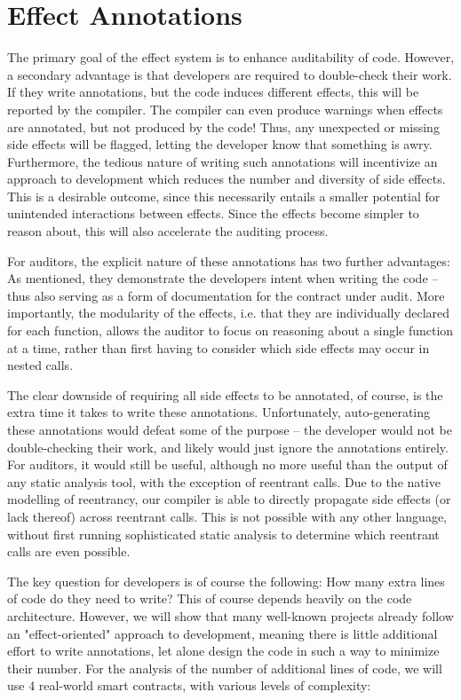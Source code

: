 \section{Effect Annotations}

The primary goal of the effect system is to enhance auditability of code. However, a secondary advantage is that developers are required to double-check their work. If they write annotations, but the code induces different effects, this will be reported by the compiler. The compiler can even produce warnings when effects are annotated, but not produced by the code! Thus, any unexpected or missing side effects will be flagged, letting the developer know that something is awry. Furthermore, the tedious nature of writing such annotations will incentivize an approach to development which reduces the number and diversity of side effects. This is a desirable outcome, since this necessarily entails a smaller potential for unintended interactions between effects. Since the effects become simpler to reason about, this will also accelerate the auditing process.
\par
For auditors, the explicit nature of these annotations has two further advantages: As mentioned, they demonstrate the developers intent when writing the code -- thus also serving as a form of documentation for the contract under audit. More importantly, the modularity of the effects, i.e. that they are individually declared for each function, allows the auditor to focus on reasoning about a single function at a time, rather than first having to consider which side effects may occur in nested calls.
\par
The clear downside of requiring all side effects to be annotated, of course, is the extra time it takes to write these annotations. Unfortunately, auto-generating these annotations would defeat some of the purpose -- the developer would not be double-checking their work, and likely would just ignore the annotations entirely. For auditors, it would still be useful, although no more useful than the output of any static analysis tool, with the exception of reentrant calls. Due to the native modelling of reentrancy, our compiler is able to directly propagate side effects (or lack thereof) across reentrant calls. This is not possible with any other language, without first running sophisticated static analysis to determine which reentrant calls are even possible.
\par
The key question for developers is of course the following: How many extra lines of code do they need to write? This of course depends heavily on the code architecture. However, we will show that many well-known projects already follow an "effect-oriented" approach to development, meaning there is little additional effort to write annotations, let alone design the code in such a way to minimize their number. For the analysis of the number of additional lines of code, we will use 4 real-world smart contracts, with various levels of complexity:

